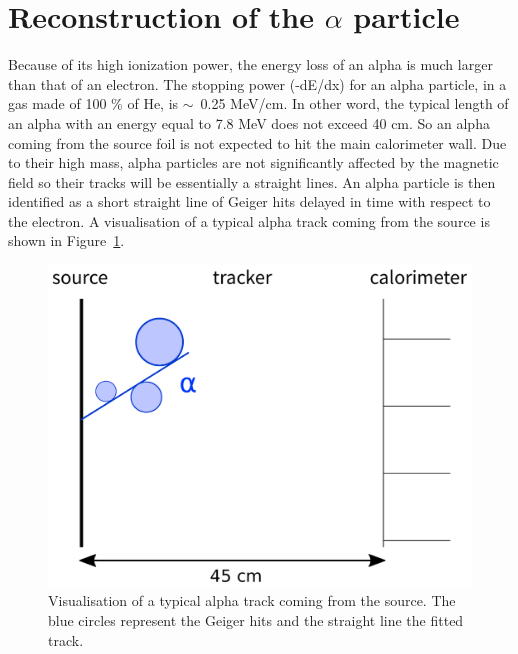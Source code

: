 \documentclass[main.tex]{subfiles}
\begin{document}


\section{Reconstruction of the $\alpha$ particle}\label{sec:ReconstructionAlphaParticle}


Because of its high ionization power, the energy loss of an alpha is much larger than that of an electron. The stopping power (-dE/dx) for an alpha particle, in a gas made of 100 \% of He, is $\sim$~0.25 MeV/cm. In other word, the typical length of an alpha with an energy equal to 7.8 MeV does not exceed 40 cm. So an alpha coming from the source foil is not expected to hit the main calorimeter wall. Due to their high mass, alpha particles are not significantly affected by the magnetic field so their tracks will be essentially a straight lines. An alpha particle is then identified as a short straight line of Geiger hits delayed in time with respect to the electron. A visualisation of a typical alpha track coming from the source is shown in Figure~\ref{visu_alpha_typical_track}.


\begin{figure}[h!]
\begin{center}
\includegraphics[scale=0.60]{pictures/Chap5/alpha_comic.pdf}
\caption{Visualisation of a typical alpha track coming from the source. The blue circles represent the Geiger hits and the straight line the fitted track.}
\label{visu_alpha_typical_track}
\end{center}
\end{figure}
\end{document}
